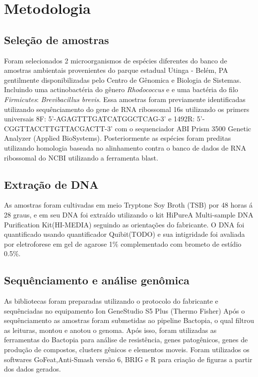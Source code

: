 \chapter{Metodologia}
\section{Seleção de amostras}
Foram selecionados 2 microorganismos de espécies diferentes do banco de amostras ambientais provenientes
do parque estadual Utinga - Belém, PA gentilmente disponibilizadas pelo Centro de Gênomica e Biologia de Sistemas.
Incluindo uma actinobactéria do gênero \textit{Rhodococcus} e e uma bactéria do filo \textit{Firmicutes}: \textit{Brevibacillus brevis}.
Essa amostras foram previamente identificadas utilizando sequênciamento do gene de RNA ribossomal 16s
utilizando os primers universais 8F: 5'-AGAGTTTGATCATGGCTCAG-3' e 1492R: 5'-CGGTTACCTTGTTACGACTT-3' com o sequenciador 
ABI Prism 3500 Genetic Analyzer (Applied BioSystems). Posteriormente as espécies foram preditas utilizando
homologia baseada no alinhamento contra o banco de dados de RNA ribossomal do NCBI utilizando a ferramenta
blast.

\section{Extração de DNA}
As amostras foram cultivadas em meio Tryptone Soy Broth (TSB) por 48 horas á 28 graus, e em
seu DNA foi extraído utilizando o kit HiPureA Multi-sample DNA Purification Kit(HI-MEDIA) seguindo as orientações
do fabricante. O DNA foi quantificado usando quantificador Quibit(TODO) e sua intigridade foi 
avaliada por eletroforese em gel de agarose 1\% complementado com brometo de estídio 0.5\%.

\section{Sequênciamento e análise genômica}
As bibliotecas foram preparadas utilizando o protocolo do fabricante e sequênciadas no equipamento
Ion GeneStudio S5 Plus (Thermo Fisher)
Após o sequênciamento as amostras foram submetidas ao pipeline Bactopia, o qual filtrou
as leituras, montou e anotou o genoma. Após isso, foram utilizadas as ferramentas do Bactopia 
para análise de resistência, genes patogênicos, genes de produção de compostos, clusters
gênicos e elementos moveis. 
Foram utilizados os softwares GoFeat,Anti-Smash versão 6, BRIG e R para criação de figuras a partir dos dados gerados.
